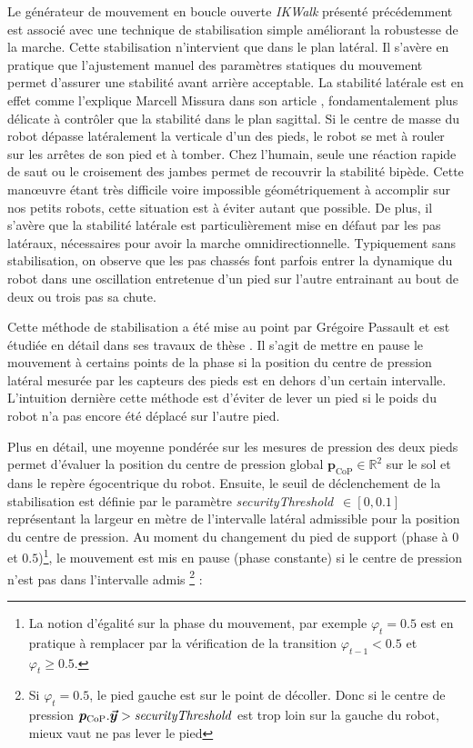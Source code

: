 Le générateur de mouvement en boucle ouverte \textit{IKWalk} présenté précédemment 
est associé avec une technique de stabilisation simple 
améliorant la robustesse de la marche.
Cette stabilisation n'intervient que dans le plan latéral.
Il s'avère en pratique que l'ajustement manuel des paramètres statiques 
du mouvement permet d'assurer une stabilité avant arrière acceptable.
La stabilité latérale est en effet comme l'explique Marcell Missura dans son 
article \cite{missura_lateral_2011}, fondamentalement plus délicate à contrôler que la 
stabilité dans le plan sagittal.
Si le centre de masse du robot dépasse latéralement la verticale
d'un des pieds, le robot se met à rouler sur les arrêtes de son pied et à tomber. 
Chez l'humain, seule une réaction rapide de saut ou le croisement des jambes permet
de recouvrir la stabilité bipède. Cette manœuvre étant très difficile voire impossible
géométriquement à accomplir sur nos petits robots, cette situation est à éviter autant
que possible.
De plus, il s'avère que la stabilité latérale est particulièrement mise en défaut 
par les pas latéraux, nécessaires pour avoir la marche omnidirectionnelle. 
Typiquement sans stabilisation, on observe que les pas chassés font parfois
entrer la dynamique du robot dans une oscillation entretenue d'un pied 
sur l'autre entrainant au bout de deux ou trois pas sa chute.

Cette méthode de stabilisation a été mise au point par Grégoire Passault
et est étudiée en détail dans ses travaux de thèse \cite{PassaultThesis}.
Il s'agit de \og mettre en pause \fg le mouvement à certains 
points de la phase si la position du centre de pression latéral mesurée par 
les capteurs des pieds est en dehors d'un certain intervalle.
L'intuition dernière cette méthode est d'éviter de lever un
pied si le poids du robot n'a pas encore été déplacé sur l'autre pied.

Plus en détail, une moyenne pondérée sur les mesures de pression des deux pieds
permet d'évaluer la position du centre de pression global
$\bm{p}_{\text{CoP}} \in \mathbb{R}^{2}$ sur le sol et dans le repère 
égocentrique du robot.
Ensuite, le seuil de déclenchement de la stabilisation est définie par le paramètre 
\textit{securityThreshold}~$\in [0,0.1]$ représentant la largeur en mètre de l'intervalle latéral
admissible pour la position du centre de pression.
Au moment du changement du pied de support 
(phase à $0$ et $0.5$)\footnote{La notion d'égalité sur la phase du mouvement, par exemple 
$\varphi_{t} = 0.5$ est en pratique à remplacer par la vérification 
de la transition $\varphi_{t-1} < 0.5$ et $\varphi_{t} \geqslant 0.5$.},
le mouvement est mis en pause (phase constante) si le centre de pression n'est pas 
dans l'intervalle admis \footnote{Si $\varphi_{t} = 0.5$, le pied gauche est sur le point de décoller. 
Donc si le centre de pression $\bm{p}_{\text{CoP}}.\bm{\vec{y}} > \text{\textit{securityThreshold}}$
est trop loin sur la gauche du robot, mieux vaut ne pas lever le pied} :

